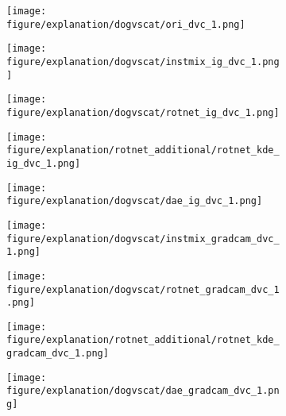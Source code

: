 \documentclass{article} \usepackage{iclr2021_conference,times}
\begin{document}
\begin{figure}[t]
\centering
\begin{subfigure}{.11\textwidth}
  \centering
  \texttt{[image: figure/explanation/dogvscat/ori\_dvc\_1.png]}
\end{subfigure}
\hspace{-2mm}
\begin{subfigure}{.11\textwidth}
  \centering
  \texttt{[image: figure/explanation/dogvscat/instmix\_ig\_dvc\_1.png]}
\end{subfigure}
\hspace{-2mm}
\begin{subfigure}{.11\textwidth}
  \centering
  \texttt{[image: figure/explanation/dogvscat/rotnet\_ig\_dvc\_1.png]}
\end{subfigure}
\hspace{-2mm}
\begin{subfigure}{.11\textwidth}
  \centering
  \texttt{[image: figure/explanation/rotnet\_additional/rotnet\_kde\_ig\_dvc\_1.png]}
\end{subfigure}
\hspace{-2mm}
\begin{subfigure}{.11\textwidth}
  \centering
  \texttt{[image: figure/explanation/dogvscat/dae\_ig\_dvc\_1.png]}
\end{subfigure}
\hspace{-2mm}
\begin{subfigure}{.11\textwidth}
  \centering
  \texttt{[image: figure/explanation/dogvscat/instmix\_gradcam\_dvc\_1.png]}
\end{subfigure}
\hspace{-2mm}
\begin{subfigure}{.11\textwidth}
  \centering
  \texttt{[image: figure/explanation/dogvscat/rotnet\_gradcam\_dvc\_1.png]}
\end{subfigure}
\hspace{-2mm}
\begin{subfigure}{.11\textwidth}
  \centering
  \texttt{[image: figure/explanation/rotnet\_additional/rotnet\_kde\_gradcam\_dvc\_1.png]}
\end{subfigure}
\hspace{-2mm}
\begin{subfigure}{.11\textwidth}
  \centering
  \texttt{[image: figure/explanation/dogvscat/dae\_gradcam\_dvc\_1.png]}
\end{subfigure}\\

\end{figure}
\end{document}

